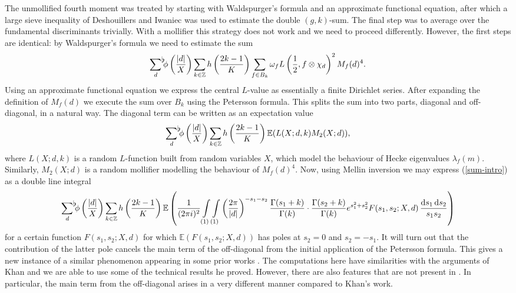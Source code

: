 \documentclass[a4paper,10pt,twoside]{amsart}
\theoremstyle{definition}
\numberwithin{equation}{section}
\newcommand\Z{\mathbb{Z}}
\renewcommand\:{\colon}
\newcommand{\sumflat}{\mathop{{\sum}^{\raisebox{-3pt}{\makebox[0pt][l]{$\flat$}}}}}
\begin{document}
The unmollified fourth moment was treated by starting with Waldspurger's formula and an approximate functional equation, after which a large sieve inequality of Deshouillers and Iwaniec was used to estimate the double $(g,k)$-sum. The final step was to average over the fundamental discriminants trivially. With a mollifier this strategy does not work and we need to proceed differently. However, the first steps are identical: by Waldspurger's formula we need to estimate the sum
\[ 
\sumflat_{d}\phi\left(\frac{|d|}X\right)\sum_{k\in\Z}h\left(\frac{2k-1}K\right)\sum_{f\in B_k}\omega_f L\left(\frac12,f\otimes\chi_d\right)^2M_f(d)^4.
\]
Using an approximate functional equation we express the central $L$-value as essentially a finite Dirichlet series. After expanding the definition of $M_f(d)$ we execute the sum over $B_k$ using the Petersson formula. This splits the sum into two parts, diagonal and off-diagonal, in a natural way. The diagonal term can be written as an expectation value
\begin{align}\label{sum-intro}
\sumflat_{d}\phi\left(\frac{|d|}X\right)\sum_{k\in\Z}h\left(\frac{2k-1}K\right)\mathbb E(L(X;d,k)M_2(X;d)),
\end{align}
where $L(X;d,k)$ is a random $L$-function built from random variables $X$, which model the behaviour of Hecke eigenvalues $\lambda_f(m)$. Similarly, $M_2(X;d)$ is a random mollifier modelling the behaviour of $M_f(d)^4$. Now, using Mellin inversion we may express (\ref{sum-intro}) as a double line integral
\[ 
\sumflat_{d}\phi\left(\frac{|d|}X\right)\sum_{k\in\Z}h\left(\frac{2k-1}K\right)\mathbb E\left(\frac1{(2\pi i)^2}\int\limits_{(1)}\int\limits_{(1)}\left(\frac{2\pi}{|d|}\right)^{-s_1-s_2}\frac{\Gamma(s_1+k)}{\Gamma(k)}\cdot\frac{\Gamma(s_2+k)}{\Gamma(k)}e^{s_1^2+s_2^2} F(s_1,s_2;X,d)\,\frac{\mathrm d s_1\,\mathrm d s_2}{s_1s_2}\right)
\]
for a certain function $F(s_1,s_2;X,d)$ for which $\mathbb E(F(s_1,s_2;X,d))$ has poles at $s_2=0$ and $s_2=-s_1$. It will turn out that the contribution of the latter pole cancels the main term of the off-diagonal from the initial application of the Petersson formula. This gives a new instance of a similar phenomenon appearing in some prior works \cite{Blomer2004, Blomer2008, Khan2010}. The computations here have similarities with the arguments of Khan \cite{Khan2010} and we are able to use some of the technical results he proved. However, there are also features that are not present in \cite{Khan2010}. In particular, the main term  from the off-diagonal arises in a very different manner compared to Khan's work. 
\end{document}
